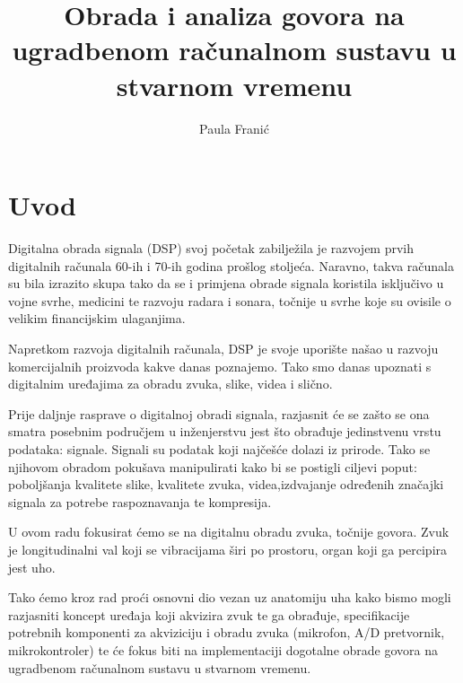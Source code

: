 \documentclass[times, utf8, diplomski]{fer}
\begin{document}

\title{Obrada i analiza govora na ugradbenom računalnom sustavu u stvarnom vremenu}

\author{Paula Franić}

\maketitle

\izvornik

\zahvala{}

\tableofcontents
\listoffigures
\chapter{Uvod}
Digitalna obrada signala (DSP) svoj početak zabilježila je razvojem prvih digitalnih računala 60-ih i 70-ih godina prošlog stoljeća. Naravno, takva računala su bila izrazito skupa tako da se i primjena obrade signala koristila isključivo u vojne svrhe, medicini te razvoju radara i sonara, točnije u svrhe koje su ovisile o velikim financijskim ulaganjima.

Napretkom razvoja digitalnih računala, DSP je svoje uporište našao u razvoju komercijalnih proizvoda kakve danas poznajemo. Tako smo danas upoznati s digitalnim uređajima za obradu zvuka, slike, videa i slično.

Prije daljnje rasprave o digitalnoj obradi signala, razjasnit će se zašto se ona smatra posebnim područjem u inženjerstvu jest što obrađuje jedinstvenu vrstu podataka: signale. Signali su podatak koji najčešće dolazi iz prirode. Tako se njihovom obradom pokušava manipulirati kako bi se postigli ciljevi poput: poboljšanja kvalitete slike, kvalitete zvuka, videa,izdvajanje određenih značajki signala za potrebe raspoznavanja te kompresija.

U ovom radu fokusirat ćemo se na digitalnu obradu zvuka, točnije govora. Zvuk je longitudinalni val koji se vibracijama širi po prostoru, organ koji ga percipira jest uho. 

Tako ćemo kroz rad proći osnovni dio vezan uz anatomiju uha kako bismo mogli razjasniti koncept uređaja koji akvizira zvuk te ga obrađuje, specifikacije potrebnih komponenti za akviziciju i obradu zvuka (mikrofon, A/D pretvornik, mikrokontroler) te će fokus biti na implementaciji dogotalne obrade govora na ugradbenom računalnom sustavu u stvarnom vremenu.
\end{document}
